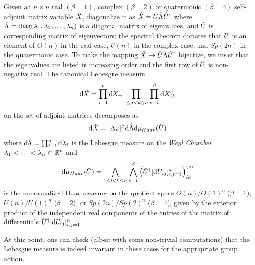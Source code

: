 \begin{prop}
	Given an $n\times n$ real $(\beta = 1)$, complex $(\beta = 2)$ or quaternionic $(\beta = 4)$ self-adjoint matrix variable $\hat X$, diagonalize it as $\hat X = \hat U \hat\Lambda \hat U^{\dagger}$ where $\hat\Lambda = \operatorname{diag}(\lambda_1, \lambda_2, \dots, \lambda_n)$ is a diagonal matrix of eigenvalues, and $\hat U$ is corresponding matrix of eigenvectors; the spectral theorem dictates that $\hat U$ is an element of $O(n)$ in the real case, $U(n)$ in the complex case, and $Sp(2n)$ in the quaternionic case. To make the mapping $\hat X \mapsto \hat U\hat\Lambda\hat U^{\dagger}$ bijective, we insist that the eigenvalues are listed in increasing order and the first row of $\hat U$ is non-negative real. The canonical Lebesgue measure 
	\begin{equation}
		\mathrm{d} \hat X = \prod_{i=1}^{n} \mathrm{d} X_{ii} \prod_{1\leq j < k \leq n} \prod_{s=1}^{\beta} \mathrm{d} X^{s}_{jk}
	\end{equation}
	on the set of adjoint matrices decomposes as 
	\begin{equation}
		\mathrm{d} \hat X = |\Delta_n|^{\beta} \mathrm{d} \hat\Lambda \mathrm{d} \mu_{Haar}(\hat U)
	\end{equation}
	where $\mathrm{d} \hat\Lambda = \prod_{i=1}^n \mathrm{d} \lambda_i$ is the Lebesgue measure on the \textit{Weyl Chamber} ${\lambda_1 < \cdots < \lambda_n} \subset \mathbb{R}^n$ and
	\begin{equation}
		\mathrm{d} \mu_{Haar}(\hat U) = \bigwedge_{1\leq l < k \leq n} \bigwedge_{s=1}^\beta \left( \hat U^{\dagger} [\mathrm{d} U_{ij}]_{i,j=1}^n \right)_{lk}^{(s)}
	\end{equation}
	is the unnormalized Haar measure on the quotient space $O(n)/O(1)^n$ ($\beta = 1$), $U(n)/U(1)^n$ ($\beta = 2$), or $Sp(2n)/Sp(2)^n$ ($\beta = 4$), given by the exterior product of the independent real components of the entries of the matrix of differentials $\hat U^{\dagger} [\mathrm{d} U_{ij}]_{i,j=1}^n$.
\end{prop}

At this point, one can check (albeit with some non-trivial computations) that the Lebesgue measure is indeed invariant in these cases for the appropriate group action. 

